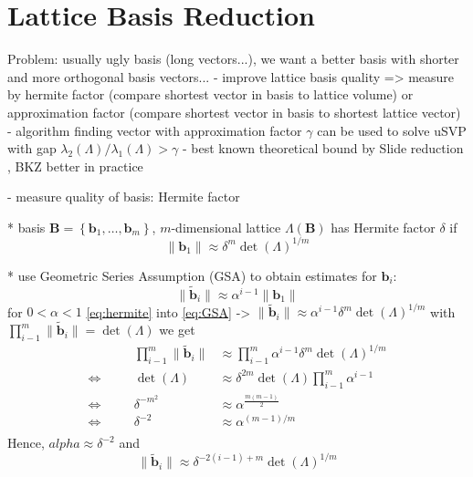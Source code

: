 
\section{Lattice Basis Reduction} %

Problem: usually ugly basis (long vectors...), we want a better basis with shorter and more orthogonal basis vectors...
- improve lattice basis quality => measure by hermite factor (compare shortest vector in basis to lattice volume) or approximation factor (compare shortest vector in basis to shortest lattice vector)
- algorithm finding vector with approximation factor $\gamma$ can be used to solve uSVP with gap $\lambda_2(\Lambda)/\lambda_1(\Lambda) > \gamma $
- best known theoretical bound by Slide reduction \cite{GN08a}, BKZ better in practice

- measure quality of basis: Hermite factor  %

  * basis $\mathbf{B} = \left\{\mathbf{b}_1, \ldots, \mathbf{b}_m\right\}$, $m$-dimensional lattice $\Lambda(\mathbf{B})$ has Hermite factor $\delta$ if
  \begin{equation} \label{eq:hermite}
    \| \mathbf{b}_1 \| \approx \delta^m \det(\Lambda)^{1/m}
  \end{equation}

  * use Geometric Series Assumption (GSA) \cite{Sch03} to obtain estimates for $\mathbf{b}_i$: %
    \begin{equation} \label{eq:GSA}
      \| \tilde{\mathbf{b}}_i \| \approx \alpha^{i-1} \| \mathbf{b}_1 \|
    \end{equation}
    for $0 < \alpha < 1$
    \cref{eq:hermite} into \cref{eq:GSA} -> $\| \tilde{\mathbf{b}}_i \| \approx \alpha^{i-1} \delta^m \det(\Lambda)^{1/m}$
    with $\prod_{i-1}^m \| \tilde{\mathbf{b}}_i \| = \det(\Lambda)$ we get 
    \begin{align*}
      &\quad& \prod_{i-1}^m \| \tilde{\mathbf{b}}_i \| &\approx \prod_{i-1}^m \alpha^{i-1} \delta^m \det(\Lambda)^{1/m} \\
      \Leftrightarrow&\quad& \det(\Lambda) &\approx \delta^{2m} \det(\Lambda) \prod_{i-1}^m \alpha^{i-1}\\
      \Leftrightarrow&\quad& \delta^{-m^2}  &\approx \alpha^{\frac{m(m-1)}{2}}\\
      \Leftrightarrow&\quad& \delta^{-2}  &\approx \alpha^{(m-1)/m}\\
    \end{align*}
    Hence, $alpha \approx \delta^{-2}$ and 
    \begin{equation}
      \| \tilde{\mathbf{b}}_i \| \approx \delta^{-2(i-1) + m} \det(\Lambda)^{1/m}
    \end{equation}

